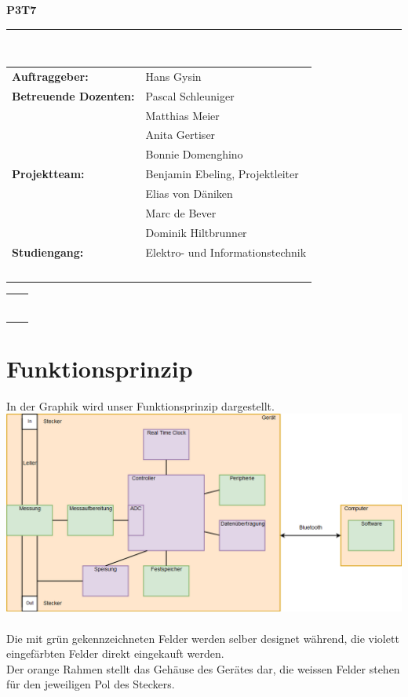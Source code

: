 \documentclass[12pt,a4paper]{article}
\begin{document}
\begin{center}


\newcommand{\HRule}{\rule{\linewidth}{0.5mm}}

{\begin{Huge}\textbf{P3T7}\end{Huge}}
\HRule \\[0.5cm]

\begin{tabular}{l l}
\textbf{Auftraggeber:} & Hans Gysin \\[0.2cm]
\textbf{Betreuende Dozenten:} & Pascal Schleuniger  \\ & Matthias Meier \\  & Anita Gertiser \\& Bonnie Domenghino \\[0.2cm]
\textbf{Projektteam:} & Benjamin Ebeling, Projektleiter \\ & Elias von Däniken \\ & Marc de Bever \\ & Dominik Hiltbrunner   \\[0.2cm]
\textbf{Studiengang:} & Elektro- und Informationstechnik\\\

\end{tabular}
\begin{tabular}{l l}
\HRule \\[0.5cm]
\end{tabular}
\end{center}



\section{Funktionsprinzip}
In der Graphik wird unser Funktionsprinzip dargestellt.
\\
\includegraphics[scale=0.45]{P3T7-Blockdiagramm.png}
\\
\\
Die mit grün gekennzeichneten Felder werden selber designet während, die violett eingefärbten Felder direkt eingekauft werden.\\
Der orange Rahmen stellt das Gehäuse des Gerätes dar, die weissen Felder stehen für den jeweiligen Pol des Steckers.
\end{document}
